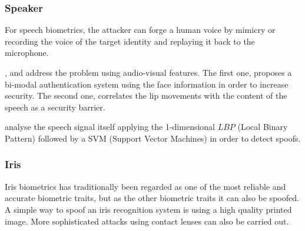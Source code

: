 



\subsubsection{Speaker}

For speech biometrics, the attacker can forge a human voice by mimicry or recording the voice of the target identity and replaying it back to the microphone. 

\cite{chetty2004liveness}, and \cite{eveno2005speaker} address the problem using audio-visual features. The first one, proposes a bi-modal authentication system using the face information in order to increase security. The second one, correlates the lip movements with the content of the speech as a security barrier.

\cite{QimingZhu} analyse the speech signal itself applying the 1-dimensional $LBP$ (Local Binary Pattern) followed by a SVM (Support Vector Machines) in order to detect spoofs.

\subsubsection{Iris}

Iris biometrics has traditionally been regarded as one of the most reliable and accurate biometric traits, but as the other biometric traits it can also be spoofed. A simple way to spoof an iris recognition system is using a high quality printed image. More sophisticated attacks using contact lenses can also be carried out.

